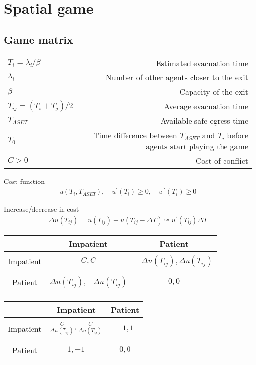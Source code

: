 \section{Spatial game}
\subsection{Game matrix}
\begin{tabularx}{1.0\linewidth}{ l R }
$ T_{i} = \lambda_{i} / \beta $ &  Estimated evacuation time \\
$ \lambda_{i} $ & Number of other agents closer to the exit \\
$ \beta $ & Capacity of the exit \\
$ T_{ij} = \left(T_{i} + T_{j}\right) / 2 $ & Average evacuation time \\
$ T_{ASET} $ & Available safe egress time \\
$ T_{0} $ & Time difference between $ T_{ASET} $ and $ T_{i} $ before agents start playing the game \\
$ C > 0 $ & Cost of conflict \\
\end{tabularx}


Cost function
\begin{align}
u(T_{i}, T_{ASET}), \quad u^{\prime}(T_{i}) \geq 0, \quad u^{\prime\prime}(T_{i}) \geq 0
\end{align}

Increase/decrease in cost
\begin{align}
\Delta u(T_{ij}) = u(T_{ij}) - u(T_{ij} - \Delta T) \approxeq u^{\prime}(T_{ij}) \Delta T
\end{align}


\begin{tabularx}{1.0\linewidth}{ c | C | C }
& Impatient & Patient \\
\hline
&& \\
Impatient & $ C, C $ & $ -\Delta u(T_{ij}), \Delta u(T_{ij}) $ \\
&& \\
\hline
&& \\
Patient & $ \Delta u(T_{ij}), -\Delta u(T_{ij}) $ & $ 0, 0 $ \\
&& \\
\end{tabularx}

\vspace{1.0cm}

\begin{tabularx}{1.0\linewidth}{ c | C | C }
& Impatient & Patient \\
\hline
&& \\
Impatient & $ \frac{C}{\Delta u(T_{ij})}, \frac{C}{\Delta u(T_{ij})} $ & $ -1, 1 $ \\
&& \\
\hline
&& \\
Patient & $ 1, -1 $ & $ 0, 0 $ \\
&& \\
\end{tabularx}

